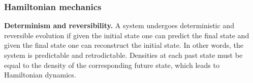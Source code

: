 \documentclass[twocolumn]{article}
\newif\ifextended
\newcommand\fact[2]{\ifextended \emph{#1}. #2 \fi}
\begin{document}
\fact{Precise physics-math correspondence} {These results gives us a precise understanding of what each layer of the mathematical structure corresponds to physically:
\begin{description}[noitemsep]
	\item \emph{Set of points:} possible states for the particles.
	\item \emph{Topological space:} ability to experimentally distinguish the states.
	\item \emph{Manifold:} states can be distinguished with a set of real valued quantities or state variables.
	\item \emph{Differentiable manifold:} we can define a distribution over the states and the state variables.
	\item \emph{Symplectic manifold:} we can define a distribution over the states that are coordinate independent.
\end{description}}

\subsubsection{Hamiltonian mechanics}

\textbf{Determinism and reversibility.} A system undergoes deterministic and reversible evolution if given the initial state one can predict the final state and given the final state one can reconstruct the initial state. In other words, the system is predictable and retrodictable. Densities at each past state must be equal to the density of the corresponding future state, which leads to Hamiltonian dynamics.
\end{document}
